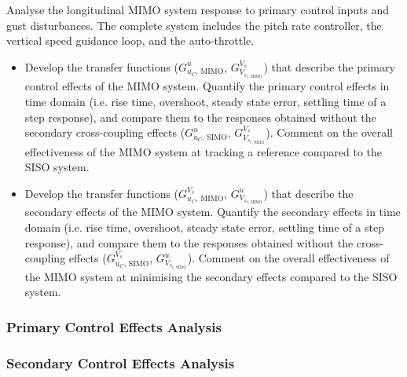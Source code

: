 Analyse the longitudinal MIMO system response to primary control inputs and gust disturbances. The complete system includes the pitch rate controller, the vertical speed guidance loop, and the auto-throttle.

\begin{itemize}
\item Develop the transfer functions ($G^{u}_{u_C \text{, MIMO}}$, $G^{V_s}_{V_{s_{c \text{, MIMO}}}}$) that describe the primary control effects of the MIMO system. Quantify the primary control effects in time domain (i.e. rise time, overshoot, steady state error, settling time of a step response), and compare them to the responses obtained without the secondary cross-coupling effects ($G^{u}_{u_C \text{, SIMO}}$, $G^{V_s}_{V_{s_{c \text{, SIMO}}}}$). Comment on the overall effectiveness of the MIMO system at tracking a reference compared to the SISO system.

\item Develop the transfer functions ($G^{V_s}_{u_C \text{, MIMO}}$, $G^{u}_{V_{s_{c \text{, MIMO}}}}$) that describe the secondary effects of the MIMO system. Quantify the secondary effects in time domain (i.e. rise time, overshoot, steady state error, settling time of a step response), and compare them to the responses obtained without the cross-coupling effects ($G^{V_s}_{u_C \text{, SIMO}}$, $G^{u}_{V_{s_{c \text{, SIMO}}}}$). Comment on the overall effectiveness of the MIMO system at minimising the secondary effects compared to the SISO system.
\end{itemize}

\subsubsection{Primary Control Effects Analysis}

\subsubsection{Secondary Control Effects Analysis}